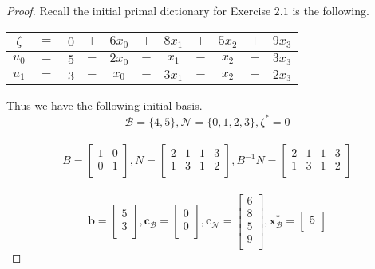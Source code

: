 \documentclass[12pt,oneside]{amsart}
\numberwithin{equation}{section}
\numberwithin{figure}{section}
\theoremstyle{plain}
\theoremstyle{definition}
\begin{document}
\begin{proof}
Recall the initial primal dictionary for Exercise $2.1$ is the following. \\
\begin{center}\begin{tabular}{|ccccccccccc|}
  \hline
  $\zeta$ & $=$ & $0$ & $+$ & $6x_0$ & $+$ & $8x_1$ & $+$ & $5x_2$ & $+$ & $9x_3$ \\
  \hline
  $u_0$   & $=$ & $5$ & $-$ & $2x_0$ & $-$ & $x_1$  & $-$ & $x_2$  & $-$ & $3x_3$ \\
  $u_1$   & $=$ & $3$ & $-$ & $x_0$  & $-$ & $3x_1$ & $-$ & $x_2$  & $-$ & $2x_3$ \\
  \hline
\end{tabular}\end{center}
Thus we have the following initial basis. \\
\[\mathscr{B} = \{4,5\},\mathscr{N} = \{0,1,2,3\},\zeta^* = 0\] \\
\[B = \begin{bmatrix}
  1 & 0 \\
  0 & 1 \\
\end{bmatrix}, N = \begin{bmatrix}
  2 & 1 & 1 & 3 \\
  1 & 3 & 1 & 2 \\
\end{bmatrix},B^{-1}N = \begin{bmatrix}
  2 & 1 & 1 & 3 \\
  1 & 3 & 1 & 2 \\
\end{bmatrix}\] \\
\[\mathbf{b} = \begin{bmatrix}
  5 \\
  3 \\
\end{bmatrix},\mathbf{c}_{\mathscr{B}} = \begin{bmatrix}
  0 \\
  0 \\
\end{bmatrix},\mathbf{c}_{\mathscr{N}} = \begin{bmatrix}
  6 \\
  8 \\
  5 \\
  9 \\
\end{bmatrix},\mathbf{x}^*_{\mathscr{B}} = \begin{bmatrix}
  5 \\

\end{bmatrix}\]
\end{proof}
\end{document}
